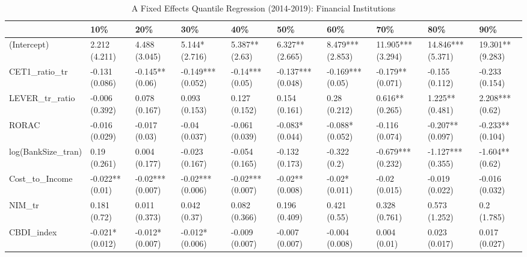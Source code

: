 \begin{table}[ht]
\centering
\caption{A Fixed Effects Quantile Regression (2014-2019): Financial Institutions} 
\begingroup\small
\begin{tabular}{llllllllll}
  \toprule
 & 10\% & 20\% & 30\% & 40\% & 50\% & 60\% & 70\% & 80\% & 90\% \\ 
  \midrule
(Intercept) & 2.212 (4.211) & 4.488 (3.045) & 5.144* (2.716) & 5.387** (2.63) & 6.327** (2.665) & 8.479*** (2.853) & 11.905*** (3.294) & 14.846*** (5.371) & 19.301** (9.283) \\ 
  CET1\_ratio\_tr & -0.131 (0.086) & -0.145** (0.06) & -0.149*** (0.052) & -0.14*** (0.05) & -0.137*** (0.048) & -0.169*** (0.05) & -0.179** (0.071) & -0.155 (0.112) & -0.233 (0.154) \\ 
  LEVER\_tr\_ratio & -0.006 (0.392) & 0.078 (0.167) & 0.093 (0.153) & 0.127 (0.152) & 0.154 (0.161) & 0.28 (0.212) & 0.616** (0.265) & 1.225** (0.481) & 2.208*** (0.62) \\ 
  RORAC & -0.016 (0.029) & -0.017 (0.03) & -0.04 (0.037) & -0.061 (0.039) & -0.083* (0.044) & -0.088* (0.052) & -0.116 (0.074) & -0.207** (0.097) & -0.233** (0.104) \\ 
  log(BankSize\_tran) & 0.19 (0.261) & 0.004 (0.177) & -0.023 (0.167) & -0.054 (0.165) & -0.132 (0.173) & -0.322 (0.2) & -0.679*** (0.232) & -1.127*** (0.355) & -1.604** (0.62) \\ 
  Cost\_to\_Income & -0.022** (0.01) & -0.02*** (0.007) & -0.02*** (0.006) & -0.02*** (0.007) & -0.02** (0.008) & -0.02* (0.011) & -0.02 (0.015) & -0.019 (0.022) & -0.016 (0.032) \\ 
  NIM\_tr & 0.181 (0.72) & 0.011 (0.373) & 0.042 (0.37) & 0.082 (0.366) & 0.196 (0.409) & 0.421 (0.55) & 0.328 (0.761) & 0.573 (1.252) & 0.2 (1.785) \\ 
  CBDI\_index & -0.021* (0.012) & -0.012* (0.007) & -0.012* (0.006) & -0.009 (0.007) & -0.007 (0.007) & -0.004 (0.008) & 0.004 (0.01) & 0.023 (0.017) & 0.017 (0.027) \\ 
   \bottomrule
\end{tabular}
\endgroup
\end{table}
